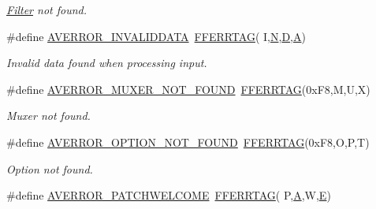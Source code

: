 \begin{DoxyCompactItemize}
\begin{DoxyCompactList}\small\item\em \hyperlink{class_filter}{Filter} not found. \end{DoxyCompactList}\item 
\#define \hyperlink{group__lavu__error_gaa6e5781e75b15ce44b0baea170c98a45}{A\+V\+E\+R\+R\+O\+R\+\_\+\+I\+N\+V\+A\+L\+I\+D\+D\+A\+TA}~\hyperlink{group__lavu__error_gacfc46235e91e0770b94f7918013a1034}{F\+F\+E\+R\+R\+T\+AG}( \textquotesingle{}I\textquotesingle{},\textquotesingle{}\hyperlink{rfft2d_test_m_l_8m_af6d1246b147a7c5763d9fc83082020ff}{N}\textquotesingle{},\textquotesingle{}\hyperlink{trigger_8c_af316c33cc298530f245e8b55330e86b5}{D}\textquotesingle{},\textquotesingle{}\hyperlink{libnyquist_2nyquist_2nyqsrc_2add_8c_a955f504eccf76b4eb2489c0adab03121}{A}\textquotesingle{})
\begin{DoxyCompactList}\small\item\em Invalid data found when processing input. \end{DoxyCompactList}\item 
\#define \hyperlink{group__lavu__error_ga7ef1e1f3183e34e731185967d416911d}{A\+V\+E\+R\+R\+O\+R\+\_\+\+M\+U\+X\+E\+R\+\_\+\+N\+O\+T\+\_\+\+F\+O\+U\+ND}~\hyperlink{group__lavu__error_gacfc46235e91e0770b94f7918013a1034}{F\+F\+E\+R\+R\+T\+AG}(0x\+F8,\textquotesingle{}\+M\textquotesingle{},\textquotesingle{}\+U\textquotesingle{},\textquotesingle{}\+X\textquotesingle{})
\begin{DoxyCompactList}\small\item\em Muxer not found. \end{DoxyCompactList}\item 
\#define \hyperlink{group__lavu__error_gaf5a8745befceddae26f2dc11ecf21679}{A\+V\+E\+R\+R\+O\+R\+\_\+\+O\+P\+T\+I\+O\+N\+\_\+\+N\+O\+T\+\_\+\+F\+O\+U\+ND}~\hyperlink{group__lavu__error_gacfc46235e91e0770b94f7918013a1034}{F\+F\+E\+R\+R\+T\+AG}(0x\+F8,\textquotesingle{}\+O\textquotesingle{},\textquotesingle{}\+P\textquotesingle{},\textquotesingle{}\+T\textquotesingle{})
\begin{DoxyCompactList}\small\item\em Option not found. \end{DoxyCompactList}\item 
\#define \hyperlink{group__lavu__error_ga67a27567a9e5b7037fee072fbcc34dbf}{A\+V\+E\+R\+R\+O\+R\+\_\+\+P\+A\+T\+C\+H\+W\+E\+L\+C\+O\+ME}~\hyperlink{group__lavu__error_gacfc46235e91e0770b94f7918013a1034}{F\+F\+E\+R\+R\+T\+AG}( \textquotesingle{}P\textquotesingle{},\textquotesingle{}\hyperlink{libnyquist_2nyquist_2nyqsrc_2add_8c_a955f504eccf76b4eb2489c0adab03121}{A}\textquotesingle{},\textquotesingle{}W\textquotesingle{},\textquotesingle{}\hyperlink{twolame_2libtwolame_2common_8h_a07484107e6d9fdf38b53edf631d6511d}{E}\textquotesingle{})

\end{DoxyCompactItemize}
